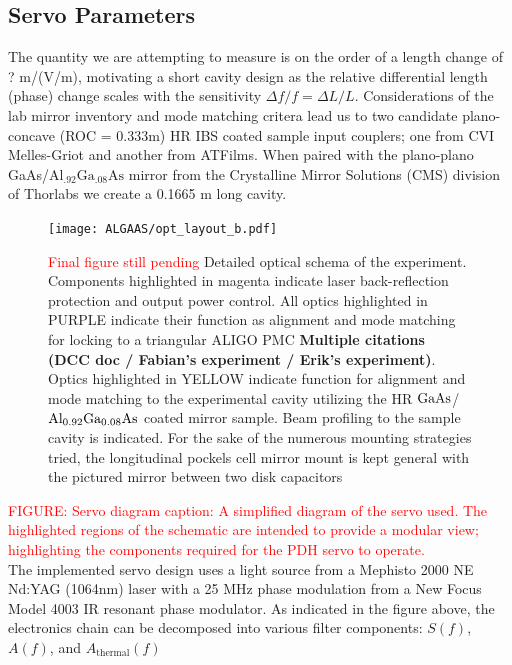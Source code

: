 \subsection{Servo Parameters}
The quantity we are attempting to measure is on the order of a length change of ? m/(V/m), motivating a short cavity design as the relative differential length (phase) change scales with the sensitivity $\Delta f / f = \Delta L / L$. Considerations of the lab mirror inventory and mode matching critera lead us to two candidate plano-concave (ROC = 0.333m) HR IBS coated sample input couplers; one from CVI Melles-Griot and another from ATFilms. When paired with the plano-plano GaAs/$\mathrm{Al_{.92}Ga_{.08}As}$  mirror from the Crystalline Mirror Solutions (CMS) division of Thorlabs we create a 0.1665 m long cavity.


\begin{figure}[H]
\begin{center}
\texttt{[image: ALGAAS/opt\_layout\_b.pdf]}
\end{center}
\caption{\textcolor{red}{Final figure still pending} Detailed optical schema of the experiment. Components highlighted in magenta indicate laser back-reflection protection and output power control. All optics highlighted in PURPLE indicate their function as alignment and mode matching for locking to a triangular ALIGO PMC \textbf{Multiple citations (DCC doc / Fabian's experiment / Erik's experiment)}. Optics highlighted in YELLOW indicate function for alignment and mode matching to the experimental cavity utilizing the HR $\mathrm{GaAs}$/$\mathrm{Al_{0.92}Ga_{0.08}As}$ coated mirror sample. Beam profiling to the sample cavity is indicated. For the sake of the numerous mounting strategies tried, the longitudinal pockels cell mirror mount is kept general with the pictured mirror between two disk capacitors}
\label{fig:detailed_optical_layout}
\end{figure}


\textcolor{red}{FIGURE: Servo diagram}
\textcolor{red}{caption: A simplified diagram of the servo used. The highlighted regions of the schematic are intended to provide a modular view; highlighting the components required for the PDH servo to operate.}
\\
The implemented servo design uses a light source from a Mephisto 2000 NE Nd:YAG (1064nm) laser with a 25 MHz phase modulation from a New Focus Model 4003 IR resonant phase modulator. As indicated in the figure above, the electronics chain can be decomposed into various filter components: $S(f)$, $A(f)$, and $A_\mathrm{thermal}(f)$

